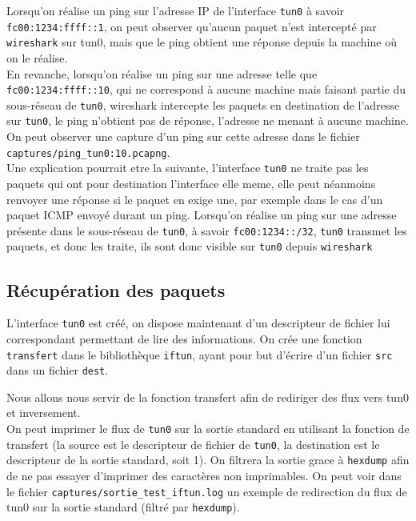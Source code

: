 \documentclass[a4paper, 10pt]{article}
\begin{document}
      Lorsqu'on réalise un ping sur l'adresse IP de l'interface \verb+tun0+ à
      savoir \verb+fc00:1234:ffff::1+, on peut observer qu'aucun paquet n'est
      intercepté par \verb+wireshark+ sur tun0, mais que le ping obtient une
      réponse depuis la machine où on le réalise. \\

      En revanche, lorsqu'on réalise un ping sur une adresse telle que
      \verb+fc00:1234:ffff::10+, qui ne correspond à aucune machine mais faisant
      partie du sous-réseau de \verb+tun0+, wireshark intercepte les paquets en
      destination de l'adresse sur \verb+tun0+, le ping n'obtient pas de réponse,
      l'adresse ne menant à aucune machine. On peut observer une capture d'un
      ping sur cette adresse dans le fichier
      \verb+captures/ping_tun0:10.pcapng+.\\

      Une explication pourrait etre la suivante, l'interface \verb+tun0+ ne
      traite pas les paquets qui ont pour destination l'interface elle meme,
      elle peut néanmoins renvoyer une réponse si le paquet en exige une, par
      exemple dans le cas d'un paquet ICMP envoyé durant un ping.
      Lorsqu'on réalise un ping sur une adresse présente dans le sous-réseau de
      \verb+tun0+, à savoir \verb+fc00:1234::/32+, \verb+tun0+ transmet les
      paquets, et donc les traite, ils sont donc visible sur \verb+tun0+ depuis
      \verb+wireshark+

    \subsection{Récupération des paquets}

      L'interface \verb+tun0+ est créé, on dispose maintenant d'un descripteur
      de fichier lui correspondant permettant de lire des informations. On crée
      une fonction \verb+transfert+ dans le bibliothèque \verb+iftun+, ayant
      pour but d'écrire d'un fichier \verb+src+ dans un fichier \verb+dest+.

      Nous allons nous servir de la fonction transfert afin de rediriger des
      flux vers tun0 et inversement. \\

      On peut imprimer le flux de \verb+tun0+ sur la sortie standard en
      utilisant la fonction de transfert (la source est le descripteur de
      fichier de \verb+tun0+, la destination est le descripteur de la sortie
      standard, soit 1). On filtrera la sortie grace à \verb+hexdump+ afin de ne
      pas essayer d'imprimer des caractères non imprimables. On peut voir dans
      le fichier \verb+captures/sortie_test_iftun.log+ un exemple de redirection
      du flux de tun0 sur la sortie standard (filtré par \verb+hexdump+).
\end{document}
